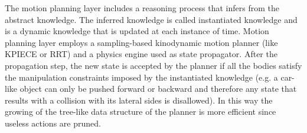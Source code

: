 \documentclass[runningheads,a4paper]{llncs}
\begin{document}
The motion planning layer includes a reasoning process that infers from the abstract knowledge. The inferred knowledge
is called instantiated knowledge and is a dynamic knowledge that is updated at each instance of time. Motion planning layer employs a sampling-based
kinodynamic motion planner (like KPIECE or RRT) and a physics engine used as state propagator. After the propagation step, the new state is accepted by the
planner if all the bodies satisfy the manipulation constraints imposed by the instantiated knowledge (e.g. a car-like object can only be pushed forward or backward and therefore any state that results with a collision with its lateral sides is disallowed). In this way the growing of the tree-like data structure of the planner is more efficient since useless actions are pruned.


\end{document}

